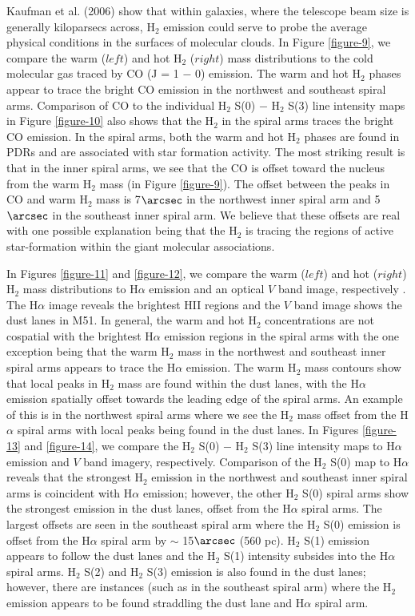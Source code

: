 \documentclass[12pt,preprint]{aastex}
\begin{document}
Kaufman et al. (2006) show that within galaxies, where the
telescope beam size is generally kiloparsecs across, H$_2$
emission could serve to probe the average physical 
conditions in the surfaces of molecular clouds.  In Figure 
\ref{figure-9}, we compare the warm ($left$) and hot
H$_2$ ($right$) mass distributions to the cold molecular 
gas traced by CO (J = 1 $-$ 0) emission.  The warm and hot 
H$_2$ phases appear to trace the bright CO emission
in the northwest and southeast spiral arms. Comparison 
of CO to the individual H$_2$  S(0) $-$ H$_2$ S(3) line intensity 
maps in Figure \ref{figure-10} also shows that the H$_2$ in 
the spiral arms traces the bright CO emission.  
In the spiral arms, both the warm and hot H$_2$ 
phases are found in PDRs and are associated 
with star formation activity.  The most 
striking result is that in the inner spiral arms, we see that the
CO is offset toward the nucleus from the 
warm H$_2$ mass (in Figure \ref{figure-9}).
The offset between the peaks in CO and warm H$_2$ mass is
7$\arcsec$ in the northwest inner spiral arm and 5$\arcsec$ in the
southeast inner spiral arm.  We believe that these offsets are real with
one possible explanation being that the H$_2$ is tracing the
regions of active star-formation within the giant molecular
associations.  

In Figures \ref{figure-11} and \ref{figure-12}, we compare the warm ($left$) and hot ($right$)
H$_2$ mass distributions to H$\alpha$ emission and an optical $V$ 
band image, respectively .  The H$\alpha$ image reveals the 
brightest HII regions and the $V$ band image shows 
the dust lanes in M51.  In general,
the warm and hot H$_2$ concentrations are not cospatial with
the brightest H$\alpha$ emission regions in the spiral arms with the one
exception being that the warm H$_2$ mass in 
the northwest and southeast inner spiral
arms appears to trace the H$\alpha$ emission.  The warm H$_2$
mass contours show that local peaks in H$_2$ mass are found
within the dust lanes, with the H$\alpha$ emission spatially 
offset towards the leading edge of the spiral arms.  
An example of this is in the northwest spiral
arms where we see the H$_2$ mass offset from the H$\alpha$
spiral arms with local peaks being found in the dust lanes.
In Figures \ref{figure-13} and \ref{figure-14}, we compare the H$_2$ S(0) $-$
H$_2$ S(3) line intensity maps to H$\alpha$ emission and $V$ band imagery, respectively.
Comparison of the H$_2$ S(0) map to H$\alpha$ reveals that
the strongest H$_2$ emission in the northwest and southeast
inner spiral arms is coincident with H$\alpha$ emission; however, the
other H$_2$ S(0) spiral arms show the strongest emission in
the dust lanes, offset from the H$\alpha$ spiral arms.  The largest
offsets are seen in the southeast spiral arm where the H$_2$
S(0) emission is offset from the H$\alpha$ spiral arm by $\sim$
15$\arcsec$ (560 pc).  H$_2$ S(1) emission appears to follow
the dust lanes and the H$_2$ S(1) intensity subsides into the
H$\alpha$ spiral arms.  H$_2$ S(2) and H$_2$ S(3)
emission is also found in the dust lanes; however, there are instances
(such as in the southeast spiral arm) where the H$_2$
emission appears to be found straddling the dust lane and H$\alpha$
spiral arm.
\end{document}
